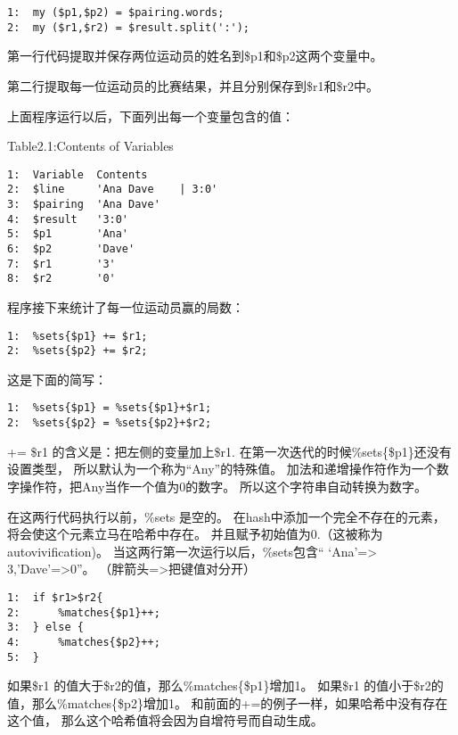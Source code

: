 \documentclass{ctexart}
\begin{document}
\begin{lstlisting}
1:  my ($p1,$p2) = $pairing.words;
2:  my ($r1,$r2) = $result.split(':');
\end{lstlisting}
第一行代码提取并保存两位运动员的姓名到\$p1和\$p2这两个变量中。

第二行提取每一位运动员的比赛结果，并且分别保存到\$r1和\$r2中。

上面程序运行以后，下面列出每一个变量包含的值：


Table2.1:Contents of Variables

\begin{lstlisting}
1:  Variable  Contents               
2:  $line     'Ana Dave    | 3:0' 
3:  $pairing  'Ana Dave'              
4:  $result   '3:0'                   
5:  $p1       'Ana'                   
6:  $p2       'Dave'                  
7:  $r1       '3'                     
8:  $r2       '0'
\end{lstlisting}

程序接下来统计了每一位运动员赢的局数：

\begin{lstlisting}
1:  %sets{$p1} += $r1;
2:  %sets{$p2} += $r2;
\end{lstlisting}
这是下面的简写：

\begin{lstlisting}
1:  %sets{$p1} = %sets{$p1}+$r1;
2:  %sets{$p2} = %sets{$p2}+$r2;
\end{lstlisting}
+= \$r1 的含义是：把左侧的变量加上\$r1.
在第一次迭代的时候\%sets\{\$p1\}还没有设置类型，
所以默认为一个称为“Any”的特殊值。
加法和递增操作符作为一个数字操作符，把Any当作一个值为0的数字。
所以这个字符串自动转换为数字。

在这两行代码执行以前，\%sets 是空的。
在hash中添加一个完全不存在的元素，将会使这个元素立马在哈希中存在。
并且赋予初始值为0.（这被称为autovivification)。
当这两行第一次运行以后，\%sets包含“ `Ana'=> 3,'Dave'=>0”。
（胖箭头=>把键值对分开）


\begin{lstlisting}
1:  if $r1>$r2{
2:      %matches{$p1}++;
3:  } else {
4:      %matches{$p2}++;
5:  }
\end{lstlisting}
如果\$r1 的值大于\$r2的值，那么\%matches\{\$p1\}增加1。
如果\$r1 的值小于\$r2的值，那么\%matches\{\$p2\}增加1。
和前面的+=的例子一样，如果哈希中没有存在这个值，
那么这个哈希值将会因为自增符号而自动生成。
\end{document}
